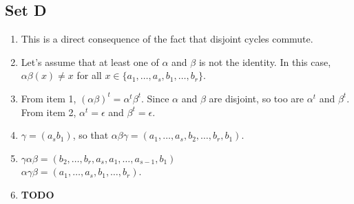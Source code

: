 \documentclass{article}
\begin{document}
\subsection{Set D}
\begin{enumerate}
    \item This is a direct consequence of the fact that disjoint cycles commute.

    \item Let's assume that at least one of $\alpha$ and $\beta$ is not the identity. In this case, $\alpha\beta(x) \ne x$ for all $x \in \{a_1, \ldots, a_s, b_1, \ldots, b_r\}$.

    \item From item 1, $(\alpha\beta)^t = \alpha^t\beta^t$. Since $\alpha$ and $\beta$ are disjoint, so too are $\alpha^t$ and $\beta^t$. From item 2, $\alpha^t = \epsilon$ and $\beta^t = \epsilon$.

    \item $\gamma = (a_sb_1)$, so that $\alpha\beta\gamma = (a_1, \ldots, a_s, b_2, \ldots, b_r, b_1)$.

    \item $\gamma\alpha\beta = (b_2, \ldots, b_r, a_s, a_1, \ldots, a_{s - 1}, b_1)$\\$\alpha\gamma\beta = (a_1, \ldots, a_s, b_1, \ldots, b_r)$.   

    \item \textbf{TODO}
\end{enumerate}
\end{document}
